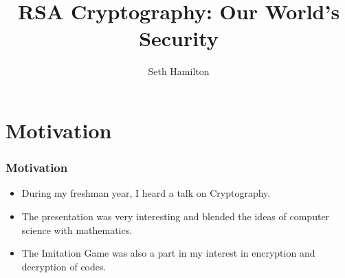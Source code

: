 \documentclass{beamer}
\title{RSA Cryptography: Our World's Security}
\author{Seth Hamilton}
\institute{Valparaiso University}
\begin{document}
\begin{frame}
\titlepage
\end{frame}
\begin{frame}
\tableofcontents
\end{frame}
\section{Motivation}
\begin{frame}
\frametitle{Motivation}
\begin{itemize}
\item During my freshman year, I heard a talk on Cryptography.
\item The presentation was very interesting and blended the ideas of computer science with mathematics.
\item The Imitation Game was also a part in my interest in encryption and decryption of codes.
\end{itemize}
\end{frame}
\end{document}
